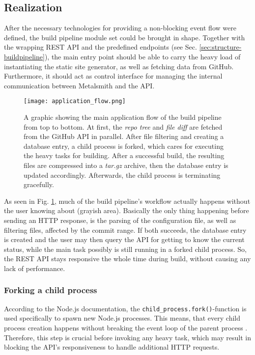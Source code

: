 \subsection{Realization}
After the necessary technologies for providing a non-blocking event flow were defined, the build pipeline module set could be brought in shape. Together with the wrapping REST API and the predefined endpoints (see Sec. \ref{sec:structure-buildpipeline}), the main entry point should be able to carry the heavy load of instantiating the static site generator, as well as fetching data from GitHub. Furthermore, it should act as control interface for managing the internal communication between Metalsmith and the API.

\begin{figure} %
    \centering
    \texttt{[image: application\_flow.png]}
    \caption{A graphic showing the main application flow of the build pipeline from top to bottom. At first, the \emph{repo tree} and \emph{file diff} are fetched from the GitHub API in parallel. After file filtering and creating a database entry, a child process is forked, which cares for executing the heavy tasks for building. After a successful build, the resulting files are compressed into a \emph{tar.gz} archive, then the database entry is updated accordingly. Afterwards, the child process is terminating gracefully.}
    \label{fig:application-flow}
\end{figure}
%

As seen in Fig. \ref{fig:application-flow}, much of the build pipeline's workflow actually happens without the user knowing about (grayish area). Basically the only thing happening before sending an HTTP response, is the parsing of the configuration file, as well as filtering files, affected by the commit range. If both succeeds, the database entry is created and the user may then query the API for getting to know the current status, while the main task possibly is still running in a forked child process. So, the REST API stays responsive the whole time during build, without causing any lack of performance.
\subsubsection{Forking a child process}
According to the Node.js documentation, the \texttt{child\_process.fork()}-function is used specifically to spawn new Node.js processes. This means, that every child process creation happens without breaking the event loop of the parent process \cite{NodejsChildProcesses}. Therefore, this step is crucial before invoking any heavy task, which may result in blocking the API's responsiveness to handle additional HTTP requests.


